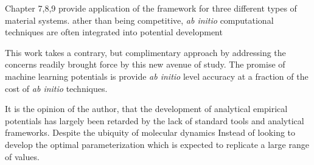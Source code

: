 
Chapter 7,8,9 provide application of the framework for three different types of material systems.
ather than being competitive, \emph{ab initio} computational techniques are often integrated into potential development

This work takes a contrary, but complimentary approach by addressing the concerns readily brought force by this new avenue of study.
The promise of machine learning potentials is provide \emph{ab initio} level accuracy at a fraction of the cost of \emph{ab initio} techniques.

It is the opinion of the author, that the development of analytical empirical potentials has largely been retarded by the lack of standard tools and analytical frameworks.
Despite the ubiquity of molecular dynamics
Instead of looking to develop the optimal parameterization which is expected to replicate a large range of values.

